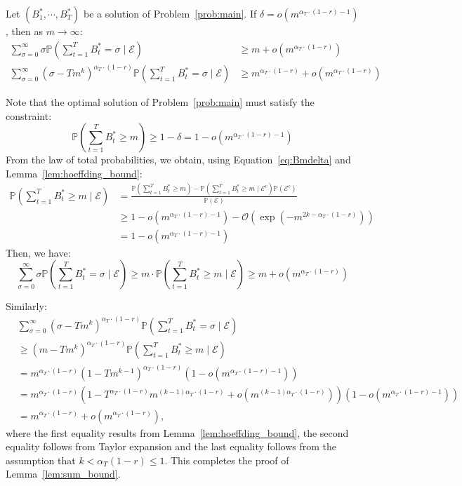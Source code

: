 \documentclass[nonblindrev]{informs3noheader}
\def\P{\mathbb{P}}
\def\calE{\mathcal{E}}
\def\calO{\mathcal{O}}
\begin{document}
\begin{lemma}\label{lem:sum_bound}
Let $(B^*_1,\cdots,B^*_T)$ be a solution of Problem~\eqref{prob:main}. If $\delta = o\left(m^{\alpha_T\cdot(1-r)-1}\right)$, then as $m \to \infty$:
\begin{align*}
    \sum_{\sigma=0}^\infty \sigma \P\left(\sum_{t=1}^T B_t^*=\sigma \mid \calE\right) & \geq m + o\left(m^{\alpha_T\cdot(1-r)}\right)\\
    \sum_{\sigma=0}^\infty(\sigma-Tm^k)^{\alpha_T\cdot(1-r)}\P\left(\sum_{t=1}^T B_t^*=\sigma\mid \calE \right)&\geq m^{\alpha_T\cdot(1-r)}+o\left(m^{\alpha_T\cdot(1-r)}\right)
\end{align*}
\end{lemma}
Note that the optimal solution of Problem~\eqref{prob:main} must satisfy the constraint:
\begin{equation}
    \P\left(\sum_{t=1}^T B_t^*\geq m\right)\geq 1-\delta = 1-o\left(m^{\alpha_T\cdot(1-r)-1}\right)\label{eq:Bmdelta}
\end{equation}
From the law of total probabilities, we obtain, using Equation~\eqref{eq:Bmdelta} and Lemma~\ref{lem:hoeffding_bound}:
\begin{align*}
    \P\left(\sum_{t=1}^T B_t^*\geq m \mid \calE\right)
    &=\frac{\P\left(\sum_{t=1}^T B_t^*\geq m\right)-\P\left(\sum_{t=1}^T B_t^*\geq m\mid \calE^c \right)\P(\calE^c)}{\P(\calE)}\\
    &\geq1-o\left(m^{\alpha_T\cdot(1-r)-1}\right)-\calO\left(\exp\left(-m^{2k-\alpha_T\cdot(1-r)}\right)\right)\\
    &=1-o\left(m^{\alpha_T\cdot(1-r)-1}\right)
\end{align*}
Then, we have:
\begin{equation*}
    \sum_{\sigma=0}^\infty \sigma \P\left(\sum_{t=1}^T B_t^*=\sigma \mid \calE\right)\geq m\cdot \P\left(\sum_{t=1}^T B_t^*\geq m \mid \calE\right)\geq m+o\left(m^{\alpha_T\cdot(1-r)}\right)
\end{equation*}

Similarly:
\begin{align*}
    &\sum_{\sigma=0}^\infty(\sigma-Tm^k)^{\alpha_T\cdot(1-r)}\P\left(\sum_{t=1}^T B_t^*
    =\sigma\mid \calE \right)\\
    &\geq (m-Tm^k)^{\alpha_T\cdot(1-r)}\P\left(\sum_{t=1}^T B_t^*\geq m\mid \calE \right)\\
    &= m^{\alpha_T\cdot(1-r)}(1-Tm^{k-1})^{\alpha_T\cdot(1-r)}\left(1-o\left(m^{\alpha_T\cdot(1-r)-1}\right)\right)\\
    &= m^{\alpha_T\cdot(1-r)}\left(1-T^{\alpha_T\cdot(1-r)}m^{(k-1)\alpha_T\cdot(1-r)}+o\left(m^{(k-1)\alpha_T\cdot(1-r)}\right)\right)\left(1-o\left(m^{\alpha_T\cdot(1-r)-1}\right)\right)\\
    &=m^{\alpha_T\cdot(1-r)}+o(m^{\alpha_T\cdot(1-r)}),
\end{align*}
where the first equality results from Lemma~\ref{lem:hoeffding_bound}, the second equality follows from Taylor expansion and the last equality follows from the assumption that $k<\alpha_T(1-r)\leq1$.
This completes the proof of Lemma~\ref{lem:sum_bound}.\hfill\Halmos
\end{document}
